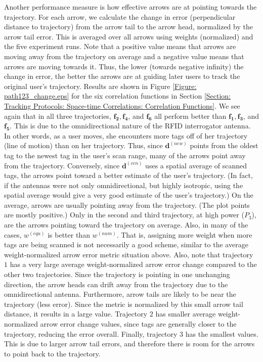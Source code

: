 Another performance measure is how effective arrows are at pointing towards the trajectory.  For each arrow, we calculate the change in error (perpendicular distance to trajectory) from the arrow tail to the arrow head, normalized by the arrow tail error.  This is averaged over all arrows using weights (normalized) and the five experiment runs.  Note that a positive value means that arrows are moving away from the trajectory on average and a negative value means that arrows are moving towards it.  Thus, the lower (towards negative infinity) the change in error, the better the arrows are at guiding later users to track the original user's trajectory.  Results are shown in Figure \ref{Figure: path123_change.eps} for the six correlation functions in Section \ref{Section: Tracking Protocols: Space-time Correlations: Correlation Functions}.  We see again that in all three trajectories, $\mathbf{f_2}, \mathbf{f_4}$, and $\mathbf{f_6}$ all perform better than $\mathbf{f_1}, \mathbf{f_3}$, and $\mathbf{f_5}$.  This is due to the omnidirectional nature of the RFID interrogator antenna.  In other words, as a user moves, she encounters more tags off of her trajectory (line of motion) than on her trajectory.  Thus, since $\mathbf{d}^{\left(new\right)}$ points from the oldest tag to the newest tag in the user's scan range, many of the arrows point away from the trajectory.  Conversely, since  $\mathbf{d}^{\left(cen\right)}$ uses a spatial average of scanned tags, the arrows point toward a better estimate of the user's trajectory.  (In fact, if the antennas were not only omnidirectional, but highly isotropic, using the spatial average would give a very good estimate of the user's trajectory.)  On the average, arrows are usually pointing away from the trajectory.  (The plot points are mostly positive.)  Only in the second and third trajectory, at high power ($P_3$), are the arrows pointing toward the trajectory on average. Also, in many of the cases, $w^{\left(equ\right)}$ is better than $w^{\left(num\right)}$. That is, assigning more weight when more tags are being scanned is not necessarily a good scheme, similar to the average weight-normalized arrow error metric situation above. Also, note that trajectory $1$ has a very large average weight-normalized arrow error change compared to the other two trajectories. Since the trajectory is pointing in one unchanging direction, the arrow heads can drift away from the trajectory due to the omnidirectional antenna. Furthermore, arrow tails are likely to be near the trajectory (less error). Since the metric is normalized by this small arrow tail distance, it results in a large value. Trajectory $2$ has smaller average weight-normalized arrow error change values, since tags are generally closer to the trajectory, reducing the error overall. Finally, trajectory $3$ has the smallest values. This is due to larger arrow tail errors, and therefore there is room for the arrows to point back to the trajectory.

